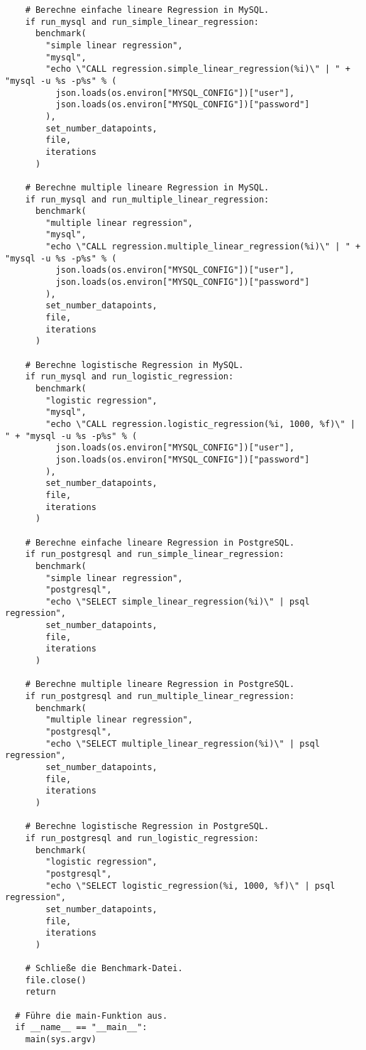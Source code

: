 \begin{verbatim}
    # Berechne einfache lineare Regression in MySQL.
    if run_mysql and run_simple_linear_regression:
      benchmark(
        "simple linear regression",
        "mysql",
        "echo \"CALL regression.simple_linear_regression(%i)\" | " + "mysql -u %s -p%s" % (
          json.loads(os.environ["MYSQL_CONFIG"])["user"],
          json.loads(os.environ["MYSQL_CONFIG"])["password"]
        ),
        set_number_datapoints,
        file,
        iterations
      )

    # Berechne multiple lineare Regression in MySQL.
    if run_mysql and run_multiple_linear_regression:
      benchmark(
        "multiple linear regression",
        "mysql",
        "echo \"CALL regression.multiple_linear_regression(%i)\" | " + "mysql -u %s -p%s" % (
          json.loads(os.environ["MYSQL_CONFIG"])["user"],
          json.loads(os.environ["MYSQL_CONFIG"])["password"]
        ),
        set_number_datapoints,
        file,
        iterations
      )

    # Berechne logistische Regression in MySQL.
    if run_mysql and run_logistic_regression:
      benchmark(
        "logistic regression",
        "mysql",
        "echo \"CALL regression.logistic_regression(%i, 1000, %f)\" | " + "mysql -u %s -p%s" % (
          json.loads(os.environ["MYSQL_CONFIG"])["user"],
          json.loads(os.environ["MYSQL_CONFIG"])["password"]
        ),
        set_number_datapoints,
        file,
        iterations
      )

    # Berechne einfache lineare Regression in PostgreSQL.
    if run_postgresql and run_simple_linear_regression:
      benchmark(
        "simple linear regression",
        "postgresql",
        "echo \"SELECT simple_linear_regression(%i)\" | psql regression",
        set_number_datapoints,
        file,
        iterations
      )

    # Berechne multiple lineare Regression in PostgreSQL.
    if run_postgresql and run_multiple_linear_regression:
      benchmark(
        "multiple linear regression",
        "postgresql",
        "echo \"SELECT multiple_linear_regression(%i)\" | psql regression",
        set_number_datapoints,
        file,
        iterations
      )

    # Berechne logistische Regression in PostgreSQL.
    if run_postgresql and run_logistic_regression:
      benchmark(
        "logistic regression",
        "postgresql",
        "echo \"SELECT logistic_regression(%i, 1000, %f)\" | psql regression",
        set_number_datapoints,
        file,
        iterations
      )

    # Schließe die Benchmark-Datei.
    file.close()
    return

  # Führe die main-Funktion aus.
  if __name__ == "__main__":
    main(sys.argv)
\end{verbatim}

